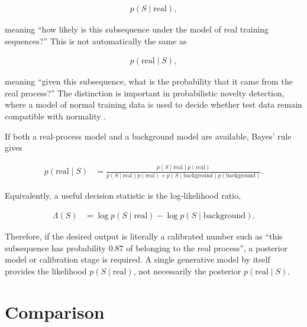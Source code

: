 \documentclass[a4paper]{article}
\begin{document}
        \begin{align}
            p(S\mid\mathrm{real}),
        \end{align}

        \noindent
        meaning ``how likely is this subsequence under the model of real training sequences?'' This is not automatically the same as

        \begin{align}
            p(\mathrm{real}\mid S),
        \end{align}

        \noindent
        meaning ``given this subsequence, what is the probability that it came from the real process?'' The distinction is important in probabilistic novelty detection, where a model of normal training data is used to decide whether test data remain compatible with normality \cite{pimentel-clifton-clifton-tarassenko-2014-a-review-of-novelty-detection}.

        If both a real-process model and a background model are available, Bayes' rule gives

        \begin{align}
            p(\mathrm{real}\mid S)
            &=
            \frac{
            p(S\mid\mathrm{real})p(\mathrm{real})
            }{
            p(S\mid\mathrm{real})p(\mathrm{real})
            +
            p(S\mid\mathrm{background})p(\mathrm{background})
            }.
        \end{align}

        \noindent
        Equivalently, a useful decision statistic is the log-likelihood ratio,

        \begin{align}
            \Lambda(S)
            &=
            \log p(S\mid\mathrm{real})
            -
            \log p(S\mid\mathrm{background}).
        \end{align}

        \noindent
        Therefore, if the desired output is literally a calibrated number such as ``this subsequence has probability \(0.87\) of belonging to the real process'', a posterior model or calibration stage is required. A single generative model by itself provides the likelihood \(p(S\mid\mathrm{real})\), not necessarily the posterior \(p(\mathrm{real}\mid S)\).

    \section{Comparison}
\end{document}
